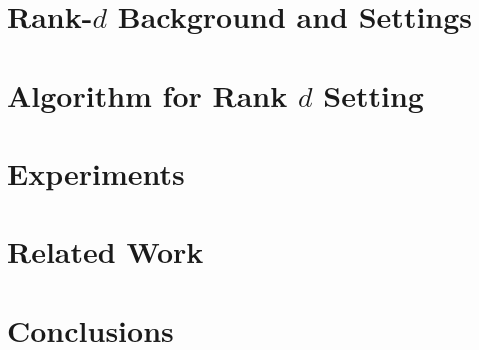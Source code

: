 \documentclass{article}
\begin{document}
\section{Rank-$d$ Background and Settings}
\label{sec:setting}



\section{Algorithm for Rank $d$ Setting}
\label{sec:algorithm}



\section{Experiments}
\label{sec:experiments}


\section{Related Work}
\label{sec:related}


\section{Conclusions}
\label{sec:conclusions}





%
\end{document}
